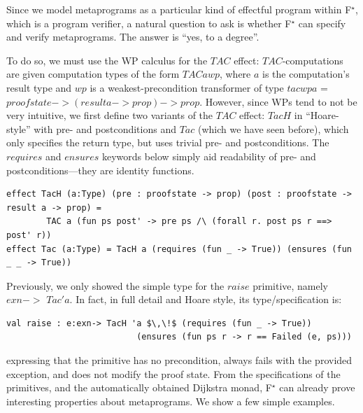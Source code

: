 \documentclass[runningheads]{llncs}
\newcommand\fstar{F$^\star$\xspace}
\newcommand{\comm}[3]{\ifcheckpagebudget\else\ifdraft{{\color{#1}[#2: #3]}}\fi\fi}
\newcommand{\ch}[1]{\comm{teal}{CH}{#1}}
\begin{document}
Since we model metaprograms as a particular kind of effectful program
within \fstar, which is a program verifier, a natural question to ask is
whether \fstar can specify and verify metaprograms.
%
The answer is ``yes, to a degree''.

%

To do so, we must use the WP calculus for the \ls$TAC$ effect:
\ls$TAC$-computations are given computation types of the form
\ls$TAC a wp$, where \ls$a$ is the computation's result type and
\ls$wp$ is a weakest-precondition transformer of type
\ls$tacwp a$ = \ls$proofstate -> (result a -> prop) -> prop$.
%
However, since WPs tend to not be very intuitive, we first define two variants
of the \ls$TAC$ effect: \ls$TacH$ in ``Hoare-style'' with pre- and
postconditions and \ls$Tac$ (which we have seen before), which
only specifies the return type, but uses trivial pre- and postconditions.
%
The \ls$requires$ and \ls$ensures$ keywords below
simply aid readability of pre- and postconditions---they are identity functions.
%
\begin{lstlisting}
effect TacH (a:Type) (pre : proofstate -> prop) (post : proofstate -> result a -> prop) =
        TAC a (fun ps post' -> pre ps /\ (forall r. post ps r ==> post' r))
effect Tac (a:Type) = TacH a (requires (fun _ -> True)) (ensures (fun _ _ -> True))
\end{lstlisting}
%
Previously, we only showed the simple type for the \ls$raise$ primitive,
namely \ls$exn ->$ \ls$Tac 'a$.
%
In fact, in full detail and Hoare style, its type/specification is:
\begin{lstlisting}
val raise : e:exn-> TacH 'a $\,\!$ (requires (fun _ -> True))
                          (ensures (fun ps r -> r == Failed (e, ps)))
\end{lstlisting}
expressing that the primitive has no precondition, always fails with
the provided exception, and does not modify the proof state.
%
From the specifications of the primitives,
and the automatically obtained Dijkstra monad,
\fstar can already prove interesting properties about
metaprograms.
%
We show a few simple examples.
\end{document}
